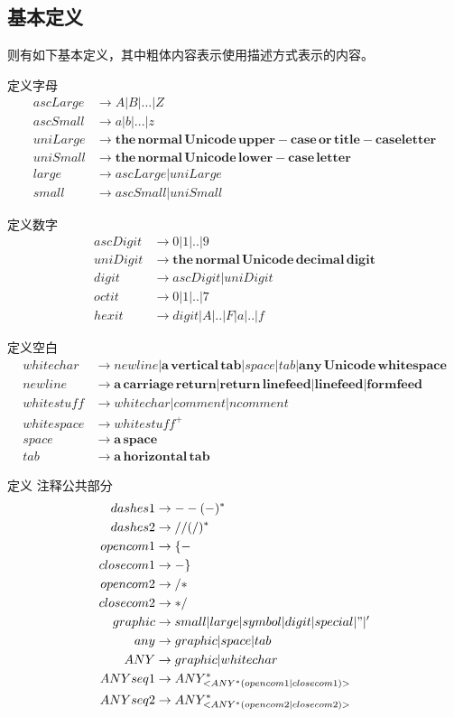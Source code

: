 \documentclass{ctexart}
\begin{document}
\subsection{基本定义}
\label{sec:lexical:basic}

则有如下基本定义，其中粗体内容表示使用描述方式表示的内容。

定义字母
\begin{align*}
ascLarge &\rightarrow A|B|...|Z \\
ascSmall &\rightarrow a|b|...|z \\
uniLarge &\rightarrow \mathbf{the\,normal\,Unicode\,upper-case\,or\,title-case letter} \\
uniSmall &\rightarrow \mathbf{the\,normal\,Unicode\,lower-case\,letter} \\
large &\rightarrow ascLarge|uniLarge \\
small &\rightarrow ascSmall|uniSmall
\end{align*}

定义数字
\begin{align*}
ascDigit &\rightarrow 0|1|..|9 \\
uniDigit &\rightarrow \mathbf{the\,normal\,Unicode\,decimal\,digit} \\
digit &\rightarrow ascDigit|uniDigit \\
octit &\rightarrow 0|1|..|7 \\
hexit &\rightarrow digit|A|..|F|a|..|f
\end{align*}

定义空白
\begin{align*}
whitechar &\rightarrow newline|\mathbf{a\,vertical\,tab}|space|tab|\mathbf{any\,Unicode\,whitespace} \\
newline &\rightarrow \mathbf{a\,carriage\,return}|\mathbf{return\,linefeed}|\mathbf{linefeed}|\mathbf{formfeed} \\
whitestuff &\rightarrow whitechar|comment|ncomment \\
whitespace &\rightarrow whitestuff^+ \\
space &\rightarrow \mathbf{a\,space} \\
tab &\rightarrow \mathbf{a\,horizontal\,tab}
\end{align*}

定义 注释公共部分
\begin{align*}
dashes1 &\rightarrow --(-)^* \\
dashes2 &\rightarrow //(/)^* \\
opencom1 &\rightarrow \{- \\
closecom1 &\rightarrow -\} \\
opencom2 &\rightarrow /* \\
closecom2 &\rightarrow */ \\
graphic &\rightarrow small|large|symbol|digit|special|"|' \\
any &\rightarrow graphic|space|tab \\
ANY &\rightarrow graphic|whitechar \\
ANYseq1 &\rightarrow ANY^*_{<ANY^*(opencom1|closecom1)>} \\
ANYseq2 &\rightarrow ANY^*_{<ANY^*(opencom2|closecom2)>}
\end{align*}
\end{document}

